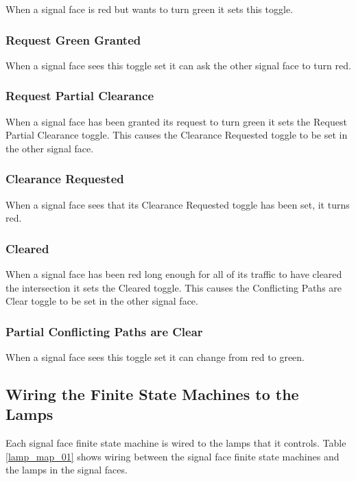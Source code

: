 \documentclass[letterpaper,twoside]{article}
\begin{document}
When a signal face is red but wants to turn green it sets this toggle.

\subsubsection{Request Green Granted}

When a signal face sees this toggle set it can ask the other signal
face to turn red.

\subsubsection{Request Partial Clearance}

When a signal face has been granted its request to turn green it sets
the Request Partial Clearance toggle.  This causes the Clearance Requested
toggle to be set in the other signal face.

\subsubsection{Clearance Requested}

When a signal face sees that its Clearance Requested toggle has been
set, it turns red.

\subsubsection{Cleared}

When a signal face has been red long enough for all of its traffic
to have cleared the intersection it sets the Cleared toggle.
This causes the Conflicting Paths are Clear toggle to be set
in the other signal face.

\subsubsection{Partial Conflicting Paths are Clear}

When a signal face sees this toggle set it can change from red
to green.

\subsection{Wiring the Finite State Machines to the Lamps}

Each signal face finite state machine is wired to the lamps that
it controls.  Table \ref{lamp_map_01} shows wiring between the signal
face finite state machines and the lamps in the signal faces.
\end{document}

